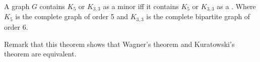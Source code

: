 \documentclass[12pt]{article}
\begin{document}
A graph $ G $ contains $ K_5 $ or $ K_{3,3} $ as a minor iff it contains $ K_5 $ or $ K_{3,3} $ as a . Where $ K_5$ is the complete graph of order 5 and $ K_{3,3}$ is the complete bipartite graph of order 6.

Remark that this theorem shows that Wagner's theorem and Kuratowski's theorem are equivalent.
\end{document}
